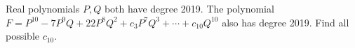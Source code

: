 Real polynomials $ P,Q $ both have degree 2019. The polynomial $ F=P^{10}-7P^9Q+22P^8Q^2+c_3P^7Q^3+\cdots+c_{10}Q^{10}$ also has degree 2019. Find all possible $ c_{10}$.

